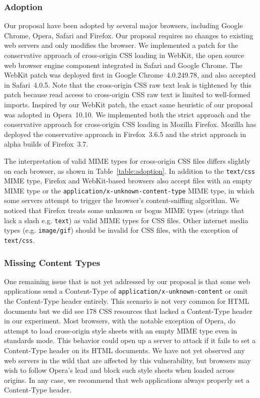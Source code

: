 \documentclass{acm_proc_article-sp}
\begin{document}
\subsubsection{Adoption}
Our proposal have been adopted by several major browsers, including Google Chrome, Opera, Safari and Firefox. Our proposal requires no changes to existing web servers and only modifies the browser. We implemented a patch for the conservative approach of cross-origin CSS loading in WebKit, the open source web browser engine component integrated in Safari and Google Chrome. The WebKit patch was deployed first in Google Chrome~4.0.249.78, and also accepted in Safari~4.0.5. Note that the cross-origin CSS raw text leak is tightened by this patch because read access to cross-origin CSS raw text is limited to well-formed imports. Inspired by our WebKit patch, the exact same heuristic of our proposal was adopted in Opera~10.10. We implemented both the strict approach and the conservative approach for cross-origin CSS loading in Mozilla Firefox. Mozilla has deployed the conservative approach in Firefox~3.6.5 and the strict approach in alpha builds of Firefox~3.7.

The interpretation of valid MIME types for cross-origin CSS files differs slightly on each browser, as shown in Table~\ref{table:adoption}. In addition to the \texttt{text/css} MIME type, Firefox and WebKit-based browsers also accept files with an empty MIME type or the \texttt{application/x-unknown-content-type} MIME type, in which some servers attempt to trigger the browser's content-sniffing algorithm. We noticed that Firefox treats some unknown or bogus MIME types (strings that lack a slash e.g. \texttt{text}) as valid MIME types for CSS files. Other internet media types (e.g. \texttt{image/gif}) should be invalid for CSS files, with the exception of \texttt{text/css}.

\subsubsection{Missing Content Types}

One remaining issue that is not yet addressed by our proposal is that some web
applications send a Content-Type of \verb|application/x-unknown-content|
or omit the Content-Type header entirely. 
This scenario is not very common for HTML documents but we did see 178 CSS resources that lacked a Content-Type header in our experiment. Most browsers,
with the notable exception of Opera, do attempt to load cross-origin
style sheets with an empty MIME type even in standards mode. 
This behavior could open up a server
to attack if it fails to set a Content-Type header on its HTML documents. We
have not yet observed any web servers in the wild that are affected by this
vulnerability, but browsers may wish to follow Opera's lead and block such
style sheets when loaded across origins. In any case, we recommend that web
applications always properly set a Content-Type header.
\end{document}
